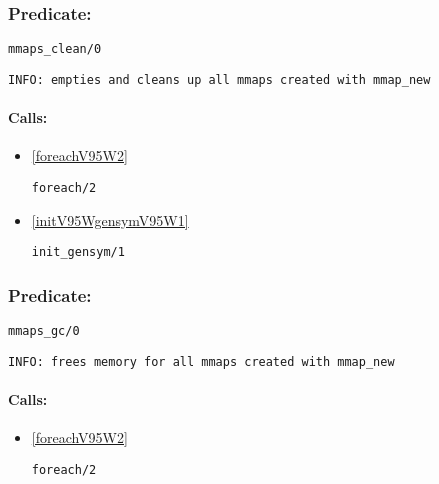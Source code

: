 \subsubsection{Predicate:} \label{mmapsV95WcleanV95W0}

\begin{verbatim}
mmaps_clean/0
\end{verbatim}

{\small \begin{verbatim}
INFO: empties and cleans up all mmaps created with mmap_new

\end{verbatim}}
\paragraph{Calls:} 
\begin{itemize}
\item \ref{foreachV95W2} 
\begin{verbatim}
foreach/2
\end{verbatim}

\item \ref{initV95WgensymV95W1} 
\begin{verbatim}
init_gensym/1
\end{verbatim}

\end{itemize}

\subsubsection{Predicate:} \label{mmapsV95WgcV95W0}

\begin{verbatim}
mmaps_gc/0
\end{verbatim}

{\small \begin{verbatim}
INFO: frees memory for all mmaps created with mmap_new

\end{verbatim}}
\paragraph{Calls:} 
\begin{itemize}
\item \ref{foreachV95W2} 
\begin{verbatim}
foreach/2
\end{verbatim}

\end{itemize}

